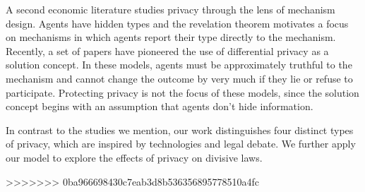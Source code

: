 A second economic literature studies privacy through the lens of mechanism design.  Agents have hidden types and the revelation theorem motivates a focus on mechanisms in which agents report their type directly to the mechanism.  Recently, a set of papers have pioneered the use of differential privacy as a solution concept.  In these models, agents must be approximately truthful to the mechanism and cannot change the outcome by very much if they lie or refuse to participate.  Protecting privacy is not the focus of these models, since the solution concept begins with an assumption that agents don't hide information.

In contrast to the studies we mention, our work distinguishes four distinct types of privacy, which are inspired by technologies and legal debate.  We further apply our model to explore the effects of privacy on divisive laws.


>>>>>>> 0ba966698430c7eab3d8b536356895778510a4fc

